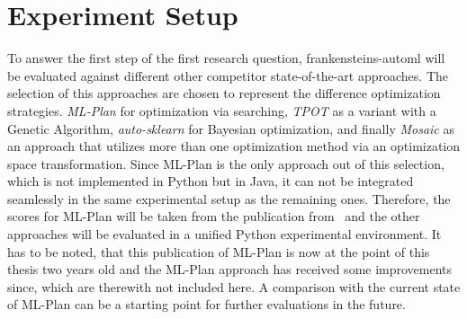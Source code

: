 \section{Experiment Setup}
\label{sec:evaluation:setup}
To answer the first step of the first research question, frankensteins-automl will be evaluated against different other competitor state-of-the-art approaches.
The selection of this approaches are chosen to represent the difference optimization strategies.
\textit{ML-Plan} for optimization via searching, \textit{TPOT} as a variant with a Genetic Algorithm, \textit{auto-sklearn} for Bayesian optimization, and finally \textit{Mosaic} as an approach that utilizes more than one optimization method via an optimization space transformation.\newline
Since ML-Plan is the only approach out of this selection, which is not implemented in Python but in Java, it can not be integrated seamlessly in the same experimental setup as the remaining ones.
Therefore, the scores for ML-Plan will be taken from the publication from~\textcite{Mohr-ML-Plan} and the other approaches will be evaluated in a unified Python experimental environment.
It has to be noted, that this publication of ML-Plan is now at the point of this thesis two years old and the ML-Plan approach has received some improvements since, which are therewith not included here.
A comparison with the current state of ML-Plan can be a starting point for further evaluations in the future.

